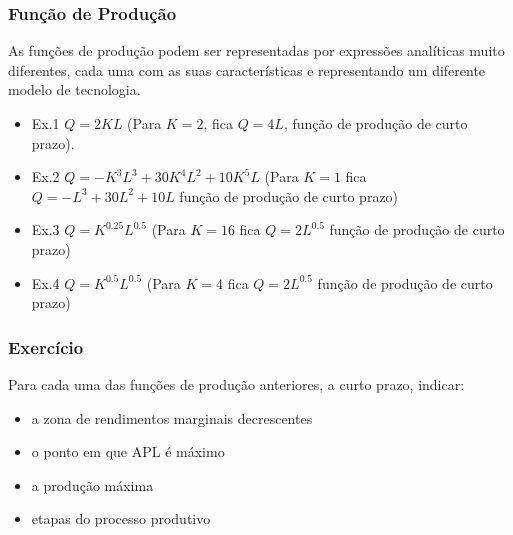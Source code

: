 \begin{frame}
	\frametitle{Fun\c c\~ao de Produ\c c\~ao}
	As fun\c c\~oes de produ\c c\~ao podem ser representadas por express\~oes anal\'iticas muito diferentes, cada uma com as suas caracter\'isticas e representando um diferente modelo de tecnologia.
	\begin{itemize}
		\item Ex.1 $Q=2KL$ (Para $K=2$, fica $Q=4L$, fun\c c\~ao de produ\c c\~ao de curto prazo).
		\item Ex.2 $Q=-K^3L^3+30K^4L^2+10K^5L$ (Para $K=1$ fica $Q=-L^3+30L^2+10L$ fun\c c\~ao de produ\c c\~ao de curto prazo)
		\item Ex.3 $Q=K^{0.25}L^{0.5}$ (Para $K=16$ fica $Q=2L^{0.5}$ fun\c c\~ao de produ\c c\~ao de curto prazo)
		\item Ex.4 $Q=K^{0.5}L^{0.5}$ (Para $K=4$ fica $Q=2L^{0.5}$ fun\c c\~ao de produ\c c\~ao de curto prazo)
	\end{itemize}
\end{frame}

\begin{frame}
	\frametitle{Exerc\'icio}
	Para cada uma das fun\c c\~oes de produ\c c\~ao anteriores, a curto prazo, indicar:
	\begin{itemize}
		\item a zona de rendimentos marginais decrescentes
		\item o ponto em que APL \'e m\'aximo
		\item a produ\c c\~ao m\'axima
		\item etapas do processo produtivo
	\end{itemize}
\end{frame}

